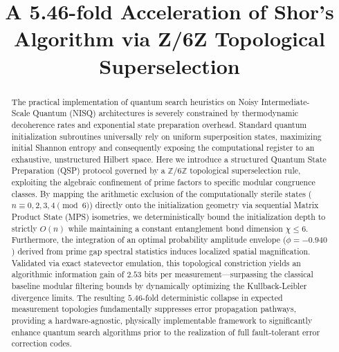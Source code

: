 \documentclass[pdflatex,sn-nature]{sn-jnl}
\theoremstyle{thmstyleone}
\theoremstyle{thmstyletwo}
\theoremstyle{thmstylethree}
\begin{document}
\title{A 5.46-fold Acceleration of Shor's Algorithm via Z/6Z Topological Superselection}

\author*[1]{ }

\begin{abstract}
The practical implementation of quantum search heuristics on Noisy Intermediate-Scale Quantum (NISQ) architectures is severely constrained by thermodynamic decoherence rates and exponential state preparation overhead. Standard quantum initialization subroutines universally rely on uniform superposition states, maximizing initial Shannon entropy and consequently exposing the computational register to an exhaustive, unstructured Hilbert space. Here we introduce a structured Quantum State Preparation (QSP) protocol governed by a $\mathbb{Z}/6\mathbb{Z}$ topological superselection rule, exploiting the algebraic confinement of prime factors to specific modular congruence classes. By mapping the arithmetic exclusion of the computationally sterile states ($n \equiv 0, 2, 3, 4 \pmod 6$) directly onto the initialization geometry via sequential Matrix Product State (MPS) isometries, we deterministically bound the initialization depth to strictly $O(n)$ while maintaining a constant entanglement bond dimension $\chi \le 6$. Furthermore, the integration of an optimal probability amplitude envelope ($\phi=-0.940$) derived from prime gap spectral statistics induces localized spatial magnification. Validated via exact statevector emulation, this topological constriction yields an algorithmic information gain of $2.53$ bits per measurement---surpassing the classical baseline modular filtering bounds by dynamically optimizing the Kullback-Leibler divergence limits. The resulting $5.46$-fold deterministic collapse in expected measurement topologies fundamentally suppresses error propagation pathways, providing a hardware-agnostic, physically implementable framework to significantly enhance quantum search algorithms prior to the realization of full fault-tolerant error correction codes.
\end{abstract}

\maketitle
\end{document}
